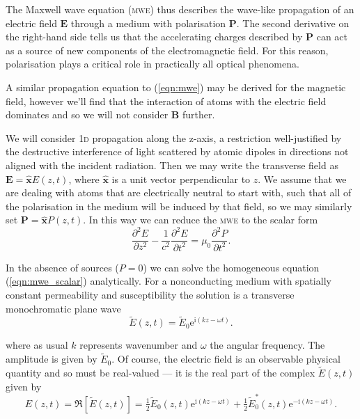     The Maxwell wave equation (\textsc{mwe}) thus describes the wave-like
    propagation of an electric field $\mathbf{E}$ through a medium with
    polarisation $\mathbf{P}$. The second derivative on the right-hand side
    tells us that the accelerating charges described by $\mathbf{P}$ can act as
    a source of new components of the electromagnetic field. For this reason,
    polarisation plays a critical role in practically all optical
    phenomena.\cite{boyd2008nonlinear}

    A similar propagation equation to (\ref{eqn:mwe}) may be derived for the
    magnetic field, however we'll find that the interaction of atoms with the
    electric field dominates and so we will not consider $\mathbf{B}$ further.

    We will consider \textsc{1d} propagation along the z-axis, a restriction
    well-justified by the destructive interference of light scattered by
    atomic dipoles in directions not aligned with the incident
    radiation\cite{hecht2015optics}. Then we may write the transverse field as
    $\mathbf{E} = \hat{\mathbf{x}} E(z, t)$, where $\hat{\mathbf{x}}$ is a unit
    vector perpendicular to $z$. We assume that we are dealing with atoms that
    are electrically neutral to start with, such that all of the polarisation in
    the medium will be induced by that field, so we may similarly set
    $\mathbf{P} = \hat{\mathbf{x}} P(z, t)$. In this way we can reduce the
    \textsc{mwe} to the scalar form
    \begin{equation}
      \frac{\partial^2 E}{\partial z^2} - \frac{1}{c^2} \frac{\partial^2
        E}{\partial t^2} =    \mu_0 \frac{\partial^2 P}{\partial t^2}.
      \label{eqn:mwe_scalar} 
    \end{equation}

    In the absence of sources (\ie $P = 0$) we can solve the homogeneous
    equation (\ref{eqn:mwe_scalar}) analytically. For a nonconducting medium
    with spatially constant permeability and susceptibility the solution is a
    transverse monochromatic plane wave\cite{jackson1998classical}
    \begin{equation}
      \tilde{E}(z,t) = \tilde{E}_0 \mathrm{e}^{\mathrm{i}(k z - \omega t)}.
      \label{eqn:plane_waves}
    \end{equation}

    where as usual $k$ represents wavenumber and $\omega$ the angular frequency.
    The amplitude is given by $\tilde{E}_0$. Of course, the electric field is an
    observable physical quantity and so must be real-valued --- it is the real
    part of the complex $\tilde{E}(z,t)$ given by
    \begin{equation}
      E(z,t) = \Re[\tilde{E}(z,t)] = \tfrac{1}{2} \tilde{E}_0(z,t) 
                    \mathrm{e}^{\mathrm{i}(k z - \omega t)} 
                + \tfrac{1}{2} \tilde{E}_0^*(z,t) 
                    \mathrm{e}^{-\mathrm{i}(k z - \omega t)}.
    \end{equation}

